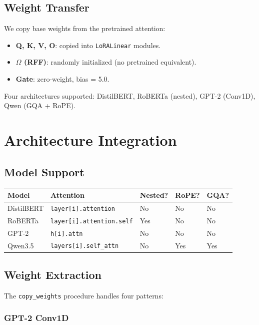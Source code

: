 \subsection{Weight Transfer}

We copy base weights from the pretrained attention:

\begin{itemize}
\item \textbf{Q, K, V, O}: copied into \texttt{LoRALinear} modules.
\item \textbf{$\Omega$ (RFF)}: randomly initialized (no pretrained equivalent).
\item \textbf{Gate}: zero-weight, bias = 5.0.

\end{itemize}
Four architectures supported: DistilBERT, RoBERTa (nested), GPT-2 (Conv1D), 
Qwen (GQA + RoPE).



\section{Architecture Integration}

\subsection{Model Support}

\begin{table}[H]
\centering
\small
\begin{tabular}{lllll}
\toprule
\textbf{Model} & \textbf{Attention} & \textbf{Nested?} & \textbf{RoPE?} & \textbf{GQA?} \\
\midrule
DistilBERT & \texttt{layer[i].attention} & No & No & No \\
RoBERTa & \texttt{layer[i].attention.self} & Yes & No & No \\
GPT-2 & \texttt{h[i].attn} & No & No & No \\
Qwen3.5 & \texttt{layers[i].self\_attn} & No & Yes & Yes \\
\bottomrule
\end{tabular}
\end{table}

\subsection{Weight Extraction}

The \texttt{copy\_weights} procedure handles four patterns:

\subsubsection{GPT-2 Conv1D}


